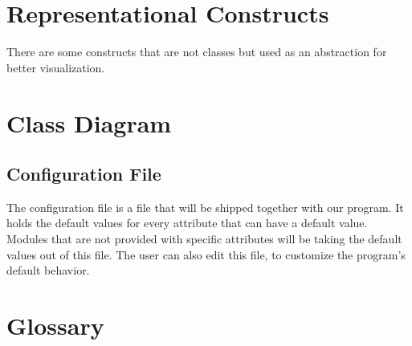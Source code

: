 \documentclass[parskip=full]{scrartcl}
\begin{document}
\section{Representational Constructs}
There are some constructs that are not classes but used as an abstraction for better visualization.

\section{Class Diagram}
\newpage
\begin{figure}[h]
\begin{center}

\label{Class Diagram}
\end{center}
\end{figure}

\subsection{Configuration File}
The configuration file is a file that will be shipped together with our program.
It holds the default values for every attribute that can have a default value.
Modules that are not provided with specific attributes will be taking the default values out of this file.
The user can also edit this file, to customize the program's default behavior.


\newpage
\section{Glossary}

\printnoidxglossaries
\end{document}
